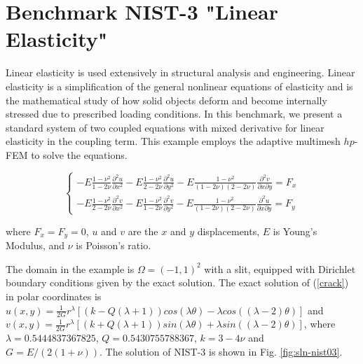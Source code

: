 \section{Benchmark NIST-3 "Linear Elasticity"}
\label{sec:bench-3}

Linear elasticity is used extensively in structural analysis
and engineering. Linear elasticity is a simplification
of the general nonlinear equations of elasticity and is the mathematical
study of how solid objects deform and become internally
stressed due to prescribed loading conditions.
In this benchmark, we present a standard system of two
coupled equations with mixed derivative for linear elasticity
in the coupling term. This example employs the adaptive multimesh $hp$-FEM
to solve the equations.

\begin{equation}\label{crack}
\left\{
\begin{array}{l}
\displaystyle
-E \frac{1-\nu^2}{1-2\nu} \frac{\partial^{2} u}{\partial x^{2}} - E\frac{1-\nu^2}{2-2 \nu} \frac{\partial^{2} u}{\partial y^{2}}
-E \frac{1-\nu^2}{(1-2\nu)(2-2\nu)} \frac{\partial^{2} v}{\partial x \partial y} = F_{x} \\
\displaystyle
-E \frac{1-\nu^2}{2-2\nu} \frac{\partial^{2} v}{\partial x^{2}} - E\frac{1-\nu^2}{1-2\nu} \frac{\partial^{2} v}{\partial y^{2}}
-E \frac{1-\nu^2}{(1-2\nu)(2-2\nu)} \frac{\partial^{2} u}{\partial x \partial y} = F_{y}
\end{array}
\right.
\end{equation}

where $F_{x} = F_{y} = 0$, $u$ and $v$ are the
$x$ and $y$ displacements, $E$ is Young's Modulus,
and $\nu$ is Poisson's ratio.

The domain in the example is $\Omega = (-1, 1)^2$ with a slit,
equipped with Dirichlet boundary conditions given by the
exact solution. The exact solution of (\ref{crack}) in polar coordinates is 
$u(x, y) = \frac{1}{2G} r^{\lambda}[(k - Q(\lambda + 1))cos(\lambda \theta) - \lambda cos((\lambda - 2) \theta)]$ and
$v(x, y) = \frac{1}{2G} r^{\lambda}[(k + Q(\lambda + 1))sin(\lambda \theta) + \lambda sin((\lambda - 2) \theta)]$, 
where $\lambda = 0.5444837367825$, $Q = 0.5430755788367$,
$k = 3 - 4 \nu$ and $G = E / (2(1 + \nu))$.
The solution of NIST-3 is shown in Fig. \ref{fig:sln-nist03}.

